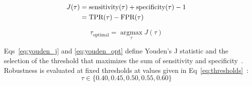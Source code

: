 \documentclass[10pt,letterpaper]{article}
\begin{document}
                                                                                                                  \begin{align}
                                                                                                                  \label{eq:youden_j}
                                                                                                                  J(\tau) &= \text{sensitivity}(\tau) + \text{specificity}(\tau) - 1 \\
                                                                                                                          &= \text{TPR}(\tau) - \text{FPR}(\tau) \notag
                                                                                                                          \end{align}

                                                                                                                          \begin{equation}
                                                                                                                          \label{eq:youden_opt}
                                                                                                                          \tau_{\text{optimal}} = \operatorname*{argmax}_{\tau} J(\tau)
                                                                                                                          \end{equation}

                                                                                                                          Eqs~\ref{eq:youden_j} and \ref{eq:youden_opt} define Youden's J statistic and the selection of the threshold that maximizes the sum of sensitivity and specificity~\cite{ref61}. Robustness is evaluated at fixed thresholds at values given in Eq~\ref{eq:thresholds}~\cite{ref60}:
                                                                                                                          \begin{equation}
                                                                                                                          \label{eq:thresholds}
                                                                                                                          \tau \in \{0.40,0.45,0.50,0.55,0.60\}
                                                                                                                          \end{equation}
\end{document}
